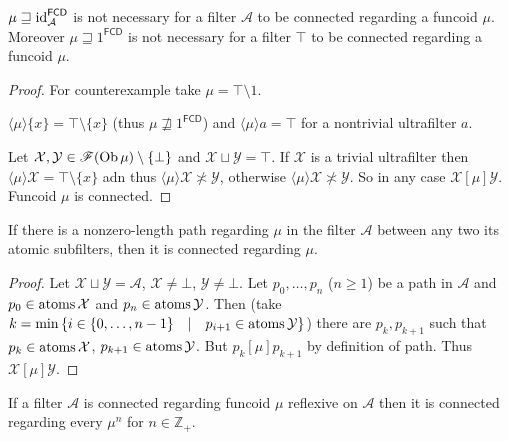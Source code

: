 \begin{example}
  $\mu \sqsupseteq \operatorname{id}^{\mathsf{FCD}}_{\mathcal{A}}$ is not
  necessary for a filter $\mathcal{A}$ to be connected regarding a funcoid
  $\mu$. Moreover $\mu \sqsupseteq 1^{\mathsf{FCD}}$ is not necessary
  for a filter $\top$ to be connected regarding a funcoid $\mu$.
\end{example}

\begin{proof}
  For counterexample take $\mu = \top \setminus 1$.

  $\langle \mu \rangle \{ x \} = \top \setminus \{ x \}$ (thus $\mu
  \mathrel{\nsqsupseteq} 1^{\mathsf{FCD}}$) and $\langle \mu
  \rangle a = \top$ for a nontrivial ultrafilter $a$.

  Let $\mathcal{X}, \mathcal{Y} \in \mathscr{F} (\operatorname{Ob} \mu) \setminus \{
  \bot \}$ and $\mathcal{X} \sqcup \mathcal{Y} = \top$. If $\mathcal{X}$ is a
  trivial ultrafilter then $\langle \mu \rangle \mathcal{X} = \top \setminus
  \{ x \}$ adn thus $\langle \mu \rangle \mathcal{X} \nasymp \mathcal{Y}$,
  otherwise $\langle \mu \rangle \mathcal{X} \nasymp \mathcal{Y}$. So in any
  case $\mathcal{X} \mathrel{[\mu]} \mathcal{Y}$. Funcoid $\mu$ is connected.
\end{proof}

\begin{prop}
  If there is a nonzero-length path regarding $\mu$ in the filter
  $\mathcal{A}$ between any two its atomic subfilters, then it is connected
  regarding $\mu$.
\end{prop}

\begin{proof}
  Let $\mathcal{X} \sqcup \mathcal{Y} = \mathcal{A}$, $\mathcal{X} \neq \bot$,
  $\mathcal{Y} \neq \bot$. Let $p_0, \ldots, p_n$ ($n \geq 1$) be a path in
  $\mathcal{A}$ and $p_0 \in \operatorname{atoms} \mathcal{X}$ and $p_n \in
  \operatorname{atoms} \mathcal{Y}$. Then (take $k = \min \left\{ i \in \{ 0, \ldots,
  n - 1 \} \hspace{1em} | \hspace{1em} p_{i + 1} \in \operatorname{atoms} \mathcal{Y}
  \right\}$) there are $p_k, p_{k + 1}$ such that $p_k \in \operatorname{atoms}
  \mathcal{X}$, $p_{k + 1} \in \operatorname{atoms} \mathcal{Y}$. But $p_k
  \mathrel{[\mu]} p_{k + 1}$ by definition of path. Thus $\mathcal{X}
  \mathrel{[\mu]} \mathcal{Y}$.
\end{proof}

\begin{prop}
  If a filter $\mathcal{A}$ is connected regarding funcoid $\mu$ reflexive on
  $\mathcal{A}$ then it is connected regarding every $\mu^n$ for $n \in
  \mathbb{Z}_+$.
\end{prop}

